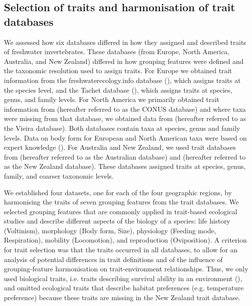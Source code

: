 \documentclass[12pt]{article}
\begin{document}
\subsection*{Selection of traits and harmonisation of trait databases}

We assessed how six databases differed in how they assigned and described traits of freshwater invertebrates. These databases (from Europe, North America, Australia, and New Zealand) differed in how grouping features were defined and the taxonomic resolution used to assign traits. For Europe we obtained trait information from the freshwaterecology.info database (\cite{schmidt-kloiber_www.freshwaterecology.info_2015}), which assigns traits at the species level, and the Tachet database (\cite{ussegliopolatera_biological_2000}), which assigns traits at species, genus, and family levels. For North America we primarily obtained trait information from \citet{twardochleb_freshwater_nodate} (hereafter referred to as the CONUS database) and where taxa were missing from that database, we obtained data from \citet{vieira_database_nodate} (hereafter referred to as the Vieira database). Both databases contain taxa at species, genus and family levels. Data on body form for European and North American taxa were based on expert knowledge (\cite{polatera_personal_information_2020}). For Australia and New Zealand, we used trait databases from \citet{keffordIntegratedDatabaseStream2020a} (hereafter referred to as the Australian database) and \citet{Philips_and_Smith_NZ_DB_2018} (hereafter referred to as the New Zealand database). These databases assigned traits at species, genus, family, and coarser taxonomic levels.

We established four datasets, one for each of the four geographic regions, by harmonising the traits of seven grouping features from the trait databases. We selected grouping features that are commonly applied in trait-based ecological studies and describe different aspects of the biology of a species: life history (Voltinism), morphology (Body form, Size), physiology (Feeding mode, Respiration), mobility (Locomotion), and reproduction (Oviposition). A criterion for trait selection was that the traits occurred in all databases, to allow for an analysis of potential differences in trait definitions and of the influence of grouping-feature harmonisation on trait-environment relationships. Thus, we only used biological traits, i.e. traits describing survival ability in an environment (\cite{violleLetConceptTrait2007}), and omitted ecological traits that describe habitat preferences (e.g. temperature preference) because these traits are missing in the New Zealand trait database.
\end{document}
